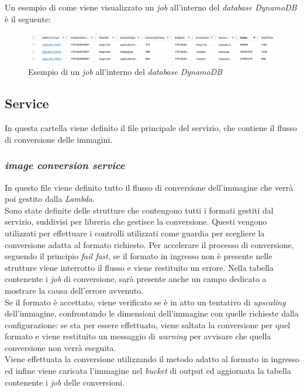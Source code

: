 Un esempio di come viene visualizzato un \emph{job} all'interno del
\emph{database DynamoDB} è il seguente:
\begin{figure}[H]
      \centering
      \includegraphics[width=1\textwidth]{images/esempio-job-dynamo.png}
      \caption{Esempio di un \emph{job} all'interno del \emph{database DynamoDB}}
\end{figure}

\subsection{Service}

In questa cartella viene definito il file principale del servizio, che contiene
il flusso di conversione delle immagini.

\subsubsection{\emph{image conversion service}}

In questo file viene definito tutto il flusso di conversione dell'immagine che
verrà poi gestito dalla \emph{Lambda}.\\
Sono state definite delle strutture che contengono tutti i formati gestiti dal
servizio, suddivisi per libreria che gestisce la conversione. Questi vengono
utilizzati per effettuare i controlli utilizzati come guardia per scegliere la
conversione adatta al formato richiesto. Per accelerare il processo di
conversione, seguendo il principio \emph{fail fast}, se il formato in ingresso
non è presente nelle strutture viene interrotto il flusso e viene restituito un
errore. Nella tabella contenente i \emph{job} di conversione, sarà presente
anche un campo dedicato a mostrare la causa dell'errore avvenuto.\\
Se il formato è accettato, viene verificato se è in atto un tentativo di
\emph{upscaling} dell'immagine, confrontando le dimensioni dell'immagine con
quelle richieste dalla configurazione: se sta per essere effettuato, viene
saltata la conversione per quel formato e viene restituito un messaggio di
\emph{warning} per avvisare che quella conversione non verrà eseguita.\\
Viene effettuata la conversione utilizzando il metodo adatto al formato in
ingresso ed infine viene caricata l'immagine nel \emph{bucket} di output ed
aggiornata la tabella contenente i \emph{job} delle conversioni.\\



